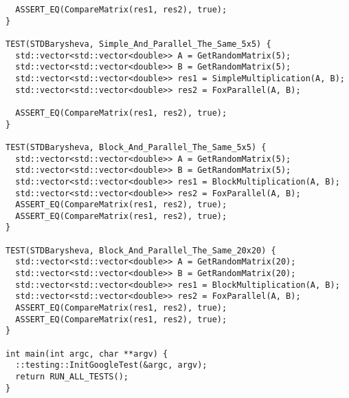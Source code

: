 \documentclass[12pt]{article}
\begin{document}
\begin{lstlisting}
  ASSERT_EQ(CompareMatrix(res1, res2), true);
}

TEST(STDBarysheva, Simple_And_Parallel_The_Same_5x5) {
  std::vector<std::vector<double>> A = GetRandomMatrix(5);
  std::vector<std::vector<double>> B = GetRandomMatrix(5);
  std::vector<std::vector<double>> res1 = SimpleMultiplication(A, B);
  std::vector<std::vector<double>> res2 = FoxParallel(A, B);

  ASSERT_EQ(CompareMatrix(res1, res2), true);
}

TEST(STDBarysheva, Block_And_Parallel_The_Same_5x5) {
  std::vector<std::vector<double>> A = GetRandomMatrix(5);
  std::vector<std::vector<double>> B = GetRandomMatrix(5);
  std::vector<std::vector<double>> res1 = BlockMultiplication(A, B);
  std::vector<std::vector<double>> res2 = FoxParallel(A, B);
  ASSERT_EQ(CompareMatrix(res1, res2), true);
  ASSERT_EQ(CompareMatrix(res1, res2), true);
}

TEST(STDBarysheva, Block_And_Parallel_The_Same_20x20) {
  std::vector<std::vector<double>> A = GetRandomMatrix(20);
  std::vector<std::vector<double>> B = GetRandomMatrix(20);
  std::vector<std::vector<double>> res1 = BlockMultiplication(A, B);
  std::vector<std::vector<double>> res2 = FoxParallel(A, B);
  ASSERT_EQ(CompareMatrix(res1, res2), true);
  ASSERT_EQ(CompareMatrix(res1, res2), true);
}

int main(int argc, char **argv) {
  ::testing::InitGoogleTest(&argc, argv);
  return RUN_ALL_TESTS();
}
\end{lstlisting}
\end{document}
